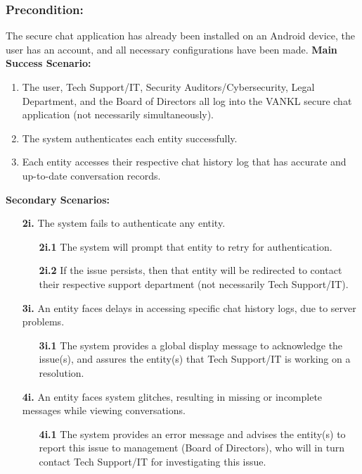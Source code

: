 \documentclass[]{article}
\begin{document}
\subsubsection*{Precondition:} The secure chat application has already been installed on an Android device, the user has an account, and all necessary configurations have been made.\newline\newline
\textbf{Main Success Scenario:}
\begin{enumerate}
	\item The user, Tech Support/IT, Security Auditors/Cybersecurity, Legal Department, and the Board of Directors all log into the VANKL secure chat application (not necessarily simultaneously).
	\item The system authenticates each entity successfully.
	\item Each entity accesses their respective chat history log that has accurate and up-to-date conversation records.
\end{enumerate}
\textbf{Secondary Scenarios:}
\begin{enumerate}
	\item[\textbf{2i.}] The system fails to authenticate any entity.
		\begin{enumerate}
			\item[\textbf{2i.1}] The system will prompt that entity to retry for authentication.
			\item[\textbf{2i.2}] If the issue persists, then that entity will be redirected to contact their respective support department (not necessarily Tech Support/IT).
		\end{enumerate}
	\item[\textbf{3i.}] An entity faces delays in accessing specific chat history logs, due to server problems.
		\begin{enumerate}
			\item[\textbf{3i.1}] The system provides a global display message to acknowledge the issue(s), and assures the entity(s) that Tech Support/IT is working on a resolution.
		\end{enumerate}
	\item[\textbf{4i.}] An entity faces system glitches, resulting in missing or incomplete messages while viewing conversations.
		\begin{enumerate}
			\item[\textbf{4i.1}] The system provides an error message and advises the entity(s) to report this issue to management (Board of Directors), who will in turn contact Tech Support/IT for investigating this issue.
		\end{enumerate}
\end{enumerate}
\end{document}
